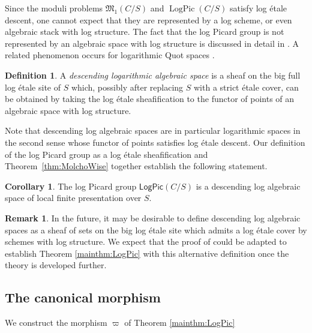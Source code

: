 \documentclass[11pt]{amsart}
\theoremstyle{definition}
\theoremstyle{definition}
\newtheorem{corollary}[theorem]{Corollary}
\newtheorem{remark}[theorem]{Remark}
\newtheorem{definition}[theorem]{Definition}
\begin{document}
Since the moduli problems $\mathfrak{M}_1(C/S)$ and $\operatorname{LogPic}(C/S)$ satisfy log \'etale descent, one cannot expect that they are represented by a log scheme, or even algebraic stack with log structure. The fact that the log Picard group is not represented by an algebraic space with log structure is discussed in detail in \cite{MolchoWise}. A related phenomenon occurs for logarithmic Quot spaces \cite{kennedy2023logarithmic}.

\begin{definition}\label{defn:logalgspace}
    A \emph{descending logarithmic algebraic space} is a sheaf on the big full log \'etale site of $S$ which, possibly after replacing $S$ with a strict \'etale cover, can be obtained by taking the log \'etale sheafification to the functor of points of an algebraic space with log structure.
\end{definition}

Note that descending log algebraic spaces are in particular logarithmic spaces in the second sense \cite[Section 10.1]{kajiwaraKatoNakayamaVII} whose functor of points satisfies log \'etale descent. 
Our definition of the log Picard group as a log \'etale sheafification and Theorem~\ref{thm:MolchoWise} together establish the following statement.

\begin{corollary}
    The log Picard group $\mathsf{LogPic}(C/S)$ is a descending log algebraic space of local finite presentation over $S$. 
\end{corollary}

\begin{remark}
    In the future, it may be desirable to define descending log algebraic spaces as a sheaf of sets on the big log \'etale site which admits a log \'etale cover by schemes with log structure. We expect that the proof of \cite[Theorem 6.6]{Alper2013GoodModuli} could be adapted to establish Theorem \ref{mainthm:LogPic} with this alternative definition once the theory is developed further. 
\end{remark}

\subsection{The canonical morphism} We construct the morphism $\varpi$ of Theorem \ref{mainthm:LogPic}
\end{document}
